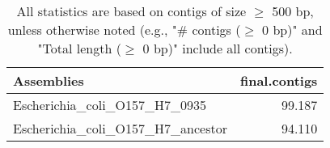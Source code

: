 \documentclass[12pt,a4paper]{article}
\begin{document}
\begin{table}[ht]
\begin{center}
\caption{All statistics are based on contigs of size $\geq$ 500 bp, unless otherwise noted (e.g., "\# contigs ($\geq$ 0 bp)" and "Total length ($\geq$ 0 bp)" include all contigs).}
\begin{tabular}{|l*{1}{|r}|}
\hline
Assemblies & final.contigs \\ \hline
Escherichia\_coli\_O157\_H7\_0935 & 99.187 \\ \hline
Escherichia\_coli\_O157\_H7\_ancestor & 94.110 \\ \hline
\end{tabular}
\end{center}
\end{table}
\end{document}
